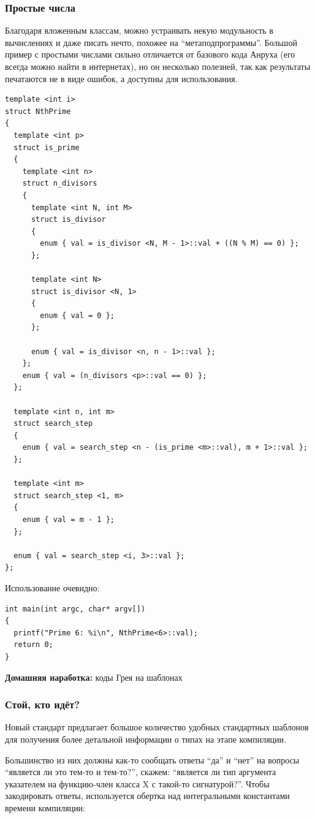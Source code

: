 \documentclass[a4paper,12pt,oneside]{article}
\begin{document}
\subsubsection{Простые числа}\label{TemplatePrimes}

Благодаря вложенным классам, можно устраивать некую модульность в вычислениях и даже писать нечто, похожее на ``метаподпрограммы''. Большой пример с простыми числами сильно отличается от базового кода Анруха (его всегда можно найти в интернетах), но он несколько полезней, так как результаты печатаются не в виде ошибок, а доступны для использования.

\begin{lstlisting}
template <int i>
struct NthPrime
{
  template <int p>
  struct is_prime
  {
    template <int n>
    struct n_divisors
    {
      template <int N, int M>
      struct is_divisor
      {
        enum { val = is_divisor <N, M - 1>::val + ((N % M) == 0) };
      };

      template <int N>
      struct is_divisor <N, 1>
      {
        enum { val = 0 };
      };

      enum { val = is_divisor <n, n - 1>::val };
    };
    enum { val = (n_divisors <p>::val == 0) };
  };

  template <int n, int m>
  struct search_step
  {
    enum { val = search_step <n - (is_prime <m>::val), m + 1>::val };
  };

  template <int m>
  struct search_step <1, m>
  {
    enum { val = m - 1 };
  };

  enum { val = search_step <i, 3>::val };
};
\end{lstlisting}

Использование очевидно:

\begin{lstlisting}
int main(int argc, char* argv[])
{
  printf("Prime 6: %i\n", NthPrime<6>::val);
  return 0;
}
\end{lstlisting}

\textbf{Домашняя наработка:} коды Грея на шаблонах

\subsubsection{Стой, кто идёт?}\label{TypeTraits}

Новый стандарт предлагает большое количество удобных стандартных шаблонов для получения более детальной информации о типах на этапе компиляции. 

Большинство из них должны как-то сообщать ответы ``да'' и ``нет'' на вопросы ``является ли это тем-то и тем-то?'', скажем: ``является ли тип аргумента указателем на функцию-член класса X с такой-то сигнатурой?''. Чтобы закодировать ответы, используется обертка над интегральными константами времени компиляции:
\end{document}
